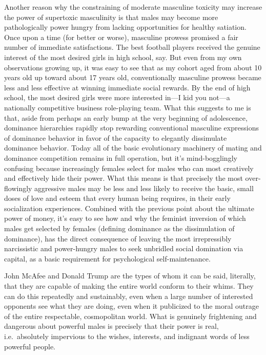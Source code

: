 \documentclass[a4paper,12pt,margin=.5in]{article}
\begin{document}
Another reason why the constraining of moderate masculine toxicity may
increase the power of supertoxic masculinity is that males may become
more pathologically power hungry from lacking opportunities for healthy
satiation. Once upon a time (for better or worse), masculine prowess
promised a fair number of immediate satisfactions. The best football
players received the genuine interest of the most desired girls in high
school, say. But even from my own observations growing up, it was easy
to see that as my cohort aged from about 10 years old up toward about 17
years old, conventionally masculine prowess became less and less
effective at winning immediate social rewards. By the end of high
school, the most desired girls were more interested in---I kid you
not---a nationally competitive business role-playing team. What this
suggests to me is that, aside from perhaps an early bump at the very
beginning of adolescence, dominance hierarchies rapidly stop rewarding
conventional masculine expressions of dominance behavior in favor of the
capacity to elegantly dissimulate dominance behavior. Today all of the
basic evolutionary machinery of mating and dominance competition remains
in full operation, but it's mind-bogglingly confusing because
increasingly females select for males who can most creatively and
effectively hide their power. What this means is that precisely the most
over-flowingly aggressive males may be less and less likely to receive
the basic, small doses of love and esteem that every human being
requires, in their early socialization experiences. Combined with the
previous point about the ultimate power of money, it's easy to see how
and why the feminist inversion of which males get selected by females
(defining dominance as the dissimulation of dominance), has the direct
consequence of leaving the most irrepressibly narcissistic and
power-hungry males to seek unbridled social domination via capital, as a
basic requirement for psychological self-maintenance.

John McAfee and Donald Trump are the types of whom it can be said,
literally, that they are capable of making the entire world conform to
their whims. They can do this repeatedly and sustainably, even when a
large number of interested opponents see what they are doing, even when
it publicized to the moral outrage of the entire respectable,
cosmopolitan world. What is genuinely frightening and dangerous about
powerful males is precisely that their power is real, i.e.~absolutely
impervious to the wishes, interests, and indignant words of less
powerful people.
\end{document}
